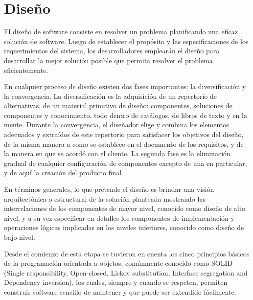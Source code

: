 \chapter{Diseño}
\label{chapter:diseno}


El diseño de software consiste en resolver un problema planificando una eficaz solución de software. Luego de establecer el propósito y las especificaciones de los requerimientos del sistema, los desarrolladores emplearán el diseño para desarrollar la mejor solución posible que permita resolver el problema eficientemente. 

En cualquier proceso de diseño existen dos fases importantes: la diversificación y la convergencia. La diversificación es la adquisición de un repertorio de alternativas, de un material primitivo de diseño: componentes, soluciones de componentes y conocimiento, todo dentro de catálogos, de libros de texto y en la mente. Durante la convergencia, el diseñador elige y combina los elementos adecuados y extraídos de este repertorio para satisfacer los objetivos del diseño, de la misma manera a como se establece en el documento de los requisitos, y de la manera en que se acordó con el cliente. La segunda fase es la eliminación gradual de cualquier configuración de componentes excepto de una en particular, y de aquí la creación del producto final.

En términos generales, lo que pretende el diseño es brindar una visión arquitectónica o estructural de la solución planteada mostrando las interrelaciones de los componentes de mayor nivel, conocido como diseño de alto nivel, y a su vez especificar en detalles los componentes de implementación y operaciones lógicas implicadas en los niveles inferiores, conocido como diseño de bajo nivel.

Desde el comienzo de esta etapa se tuvieron en cuenta los cinco principios básicos de la programación orientada a objetos, comúnmente conocido como SOLID (Single responsibility, Open-closed, Liskov substitution, Interface segregation and Dependency inversion), los cuales, siempre y cuando se respeten, permiten construir software sencillo de mantener y que puede ser extendido fácilmente.

